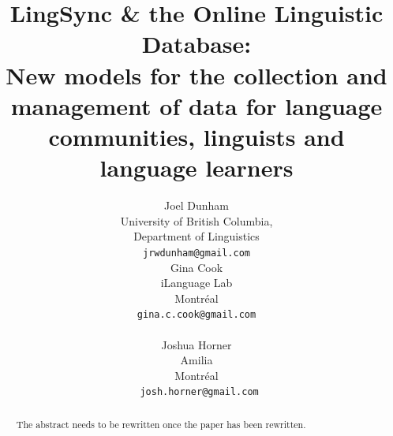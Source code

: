 \documentclass[11pt]{article}
\title{LingSync \& the Online Linguistic Database:\\New models for the
    collection and management of data for language communities, linguists and
language learners}
\author{Joel Dunham \\
University of British Columbia,   \\
Department of Linguistics \\
{\tt jrwdunham@gmail.com} \\\And
Gina Cook \\
iLanguage Lab \\
Montr\'eal \\
{\tt gina.c.cook@gmail.com} \\  \\\And
Joshua Horner \\
Amilia  \\
Montr\'eal \\
{\tt ~josh.horner@gmail.com} \\ }
\date{}
\begin{document}
\maketitle
\tableofcontents

\begin{abstract}
The abstract needs to be rewritten once the paper has been rewritten.
\end{abstract}

\end{document}
